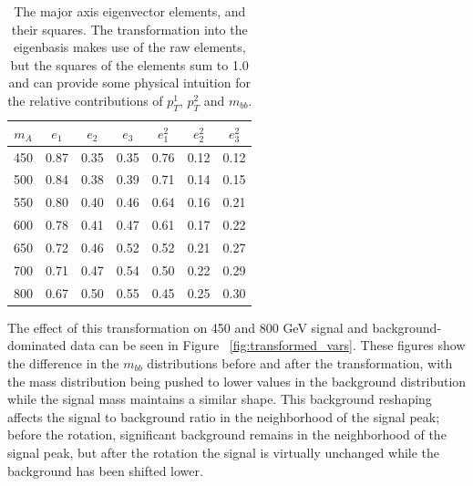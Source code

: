 

\begin{table}
    \center
    \caption{The major axis eigenvector elements, and their squares.  The
    transformation into the eigenbasis makes use of the raw elements, but the
    squares of the elements sum to 1.0 and can provide some physical intuition
    for the relative contributions of $p_T^1$, $p_T^2$ and $m_{bb}$. \label{tab:eigenvector_elements}}
    \begin{tabular}{ c c c c c c c } \hline \hline
        $m_A$ & $e_1$ & $e_2$ & $e_3$ & $e_1^2$ & $e_2^2$ & $e_3^2$ \\ \hline
        450 & 0.87 & 0.35 & 0.35 & 0.76 & 0.12 & 0.12 \\
        500 & 0.84 & 0.38 & 0.39 & 0.71 & 0.14 & 0.15 \\
        550 & 0.80 & 0.40 & 0.46 & 0.64 & 0.16 & 0.21 \\
        600 & 0.78 & 0.41 & 0.47 & 0.61 & 0.17 & 0.22 \\
        650 & 0.72 & 0.46 & 0.52 & 0.52 & 0.21 & 0.27 \\
        700 & 0.71 & 0.47 & 0.54 & 0.50 & 0.22 & 0.29 \\
        800 & 0.67 & 0.50 & 0.55 & 0.45 & 0.25 & 0.30 \\ 
        \hline
    \end{tabular}
\end{table} 

The effect of this transformation on 450 and 800 GeV signal and background-dominated
data can be seen in Figure ~\ref{fig:transformed_vars}.  These figures show
the difference in the $m_{bb}$ distributions %
before and after the transformation,
with the mass distribution being pushed to lower values
in the background distribution while the signal mass maintains a similar shape.  
This background reshaping affects the signal to background ratio in the 
neighborhood of the signal peak; before the rotation,
significant background remains in the neighborhood of the signal peak, 
but after the rotation the signal is virtually
unchanged while the background has been shifted lower.  

